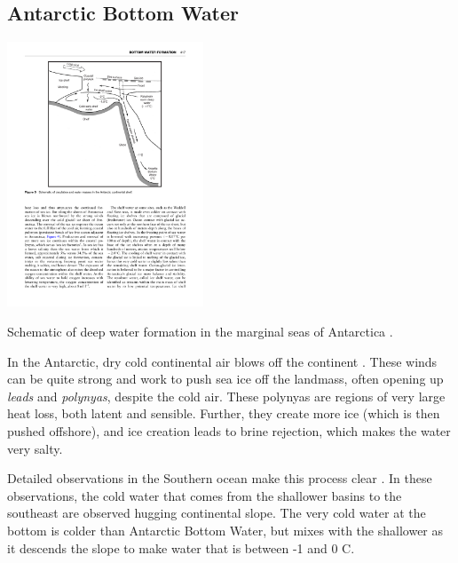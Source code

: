 \subsection{Antarctic Bottom Water}

\begin{marginfigure}
  \includegraphics[width=2.3in]{figs/WaterMasses/Gordon09Fig3}
    \caption{Schematic of deep water formation in the marginal seas of Antarctica \citep{gordon01}.}
    \label{fig:Gordon09Fig3}  
\end{marginfigure}

In the Antarctic, dry cold continental air blows off the continent .  These winds can be quite strong and work to push sea ice off the landmass, often opening up \emph{leads} and \emph{polynyas}, despite the cold air.  These polynyas are regions of very large heat loss, both latent and sensible.  Further, they create more ice (which is then pushed offshore), and ice creation leads to brine rejection, which makes the water very salty.  

Detailed observations in the Southern ocean make this process clear .  In these observations, the cold water that comes from the shallower basins to the southeast are observed hugging continental slope.  The very cold water at the bottom is colder than Antarctic Bottom Water, but mixes with the shallower as it descends the slope to make water that is between -1 and 0 C.  

